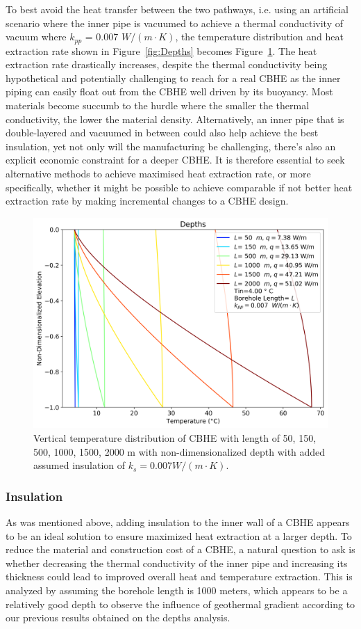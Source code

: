 		To best avoid the heat transfer between the two pathways, i.e. using an artificial scenario where the inner pipe is vacuumed to achieve a thermal conductivity of vacuum where $k_{pp}$ = 0.007 $W/(m\cdot K)$, the temperature distribution and heat extraction rate shown in Figure~\ref{fig:Depths} becomes Figure~\ref{fig:kpp007}. The heat extraction rate drastically increases, despite the thermal conductivity being hypothetical and potentially challenging to reach for a real CBHE as the inner piping can easily float out from the CBHE well driven by its buoyancy. Most materials become succumb to the hurdle where the smaller the thermal conductivity, the lower the material density.  Alternatively, an inner pipe that is double-layered and vacuumed in between could also help achieve the best insulation, yet not only will the manufacturing be challenging, there's also an explicit economic constraint for a deeper CBHE. It is therefore essential to seek alternative methods to achieve maximised heat extraction rate, or more specifically, whether it might be possible to achieve comparable if not better heat extraction rate by making incremental changes to a CBHE design.
        \begin{figure}[h!]
            \centering
            \includegraphics[width=.65\textwidth]{depths_5_kpp007.png}
            \caption{Vertical temperature distribution of CBHE with length of 50, 150, 500, 1000, 1500, 2000 m with non-dimensionalized depth with added assumed insulation of $k_s=0.007 W/(m\cdot K)$.}
            \label{fig:kpp007}
        \end{figure}
    \subsubsection{Insulation}
    	As was mentioned above, adding insulation to the inner wall of a CBHE appears to be an ideal solution to ensure maximized heat extraction at a larger depth. To reduce the material and construction cost of a CBHE, a natural question to ask is whether decreasing the thermal conductivity of the inner pipe and increasing its thickness could lead to improved overall heat and temperature extraction. This is analyzed by assuming the borehole length is 1000 meters, which appears to be a relatively good depth to observe the influence of geothermal gradient according to our previous results obtained on the depths analysis.
        
